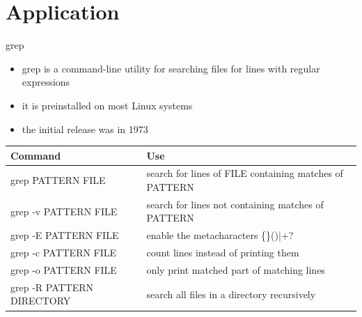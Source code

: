 \documentclass[10pt, graphics, aspectratio=169, table]{beamer}
\begin{document}
    \section{Application}
    \begin{frame}{grep}
        \begin{itemize}
            \item grep is a command-line utility for searching files for lines with regular expressions
            \item it is preinstalled on most Linux systems
            \item the initial release was in 1973
        \end{itemize}
        \begin{center}
            \begin{tabular}{ll}
                \toprule
                Command & Use \\
                \midrule
                grep PATTERN FILE & search for lines of FILE containing matches of PATTERN \\
                grep -v PATTERN FILE & search for lines not containing matches of PATTERN \\
                grep -E PATTERN FILE & enable the metacharacters \{\}()|+? \\
                grep -c PATTERN FILE & count lines instead of printing them \\
                grep -o PATTERN FILE & only print matched part of matching lines \\
                grep -R PATTERN DIRECTORY & search all files in a directory recursively \\
                \bottomrule
            \end{tabular}
        \end{center}
    \end{frame}
\end{document}
